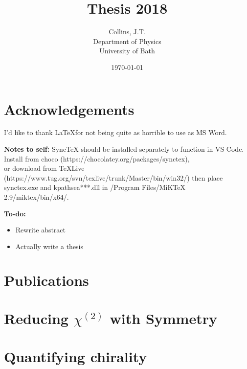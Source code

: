 \documentclass[11pt,a4paper,final]{report}
\title{Thesis 2018}
\author{
	Collins, J.T. \\ 
	Department of Physics\\
	University of Bath\\
}
\date{\today}
\begin{document}
\begin{titlepage}
    
\end{titlepage}


\begin{abstract}
    
\end{abstract}
\clearpage


\clearpage
\tableofcontents
\clearpage


\chapter*{Acknowledgements}

\color{red}
I'd like to thank \LaTeX  for not being quite as horrible to use as MS Word.

\noindent\textbf{Notes to self:}
\noindent SyncTeX should be installed separately to function in VS Code. 
\noindent Install from choco (https://chocolatey.org/packages/synctex), \\or download from TeXLive (https://www.tug.org/svn/texlive/trunk/Master/bin/win32/) then place synctex.exe and kpathsea***.dll in /Program Files/MiKTeX 2.9/miktex/bin/x64/.

\noindent\textbf{To-do:}
\begin{itemize}
	\item Rewrite abstract
    \item Actually write a thesis
\end{itemize}
\color{black}

\chapter*{Publications}


\bigskip \noindent {}

\bigskip \noindent {}

\bigskip \noindent {}

\bigskip \noindent {}













%


\clearpage

\appendix
\chapter{Reducing \texorpdfstring{$\chi^{(2)}$}{Lg} with Symmetry}
\chapter{Quantifying chirality}

\end{document}
